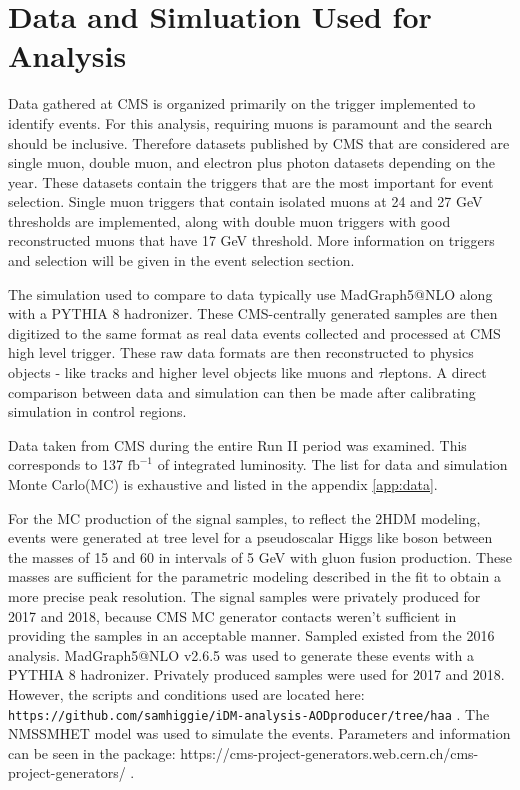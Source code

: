 \section{Data and Simluation Used for Analysis}
Data gathered at CMS is organized primarily on the trigger implemented to identify events. For this analysis, requiring muons is paramount and the search should be inclusive. Therefore datasets published by CMS that are considered are single muon, double muon, and electron plus photon datasets depending on the year. These datasets contain the triggers that are the most important for event selection. Single muon triggers that contain isolated muons at 24 and 27 GeV thresholds are implemented, along with double muon triggers with good reconstructed muons that have 17 GeV threshold. More information on triggers and selection will be given in the event selection section. 

The simulation used to compare to data typically use MadGraph5@NLO along with a PYTHIA 8 hadronizer. These CMS-centrally generated samples are then digitized to the same format as real data events collected and processed at CMS high level trigger. These raw data formats are then reconstructed to physics objects - like tracks and higher level objects like muons and $\tau$leptons. A direct comparison between data and simulation can then be made after calibrating simulation in control regions. 

Data taken from CMS during the entire Run II period was examined. This corresponds to 137 $\text{fb}^{-1}$ of integrated luminosity. The list for data and simulation Monte Carlo(MC) is exhaustive and listed in the appendix \ref{app:data}.   

For the MC production of the signal samples, to reflect the 2HDM modeling, events were generated at tree level for a pseudoscalar Higgs like boson between the masses of 15 and 60 in intervals of 5 GeV with gluon fusion production. These masses are sufficient for the parametric modeling described in the fit to obtain a more precise peak resolution. The signal samples were privately produced for 2017 and 2018, because CMS MC generator contacts weren't sufficient in providing the samples in an acceptable manner. Sampled existed from the 2016 analysis. 
MadGraph5@NLO v2.6.5 was used to generate these events with a PYTHIA 8 hadronizer. Privately produced samples were used for 2017 and 2018. However, the scripts and conditions used are located here:
 \texttt{https://github.com/samhiggie/iDM-analysis-AODproducer/tree/haa} .
The NMSSMHET model was used to simulate the events. Parameters and information can be seen in the package:
https://cms-project-generators.web.cern.ch/cms-project-generators/ .



